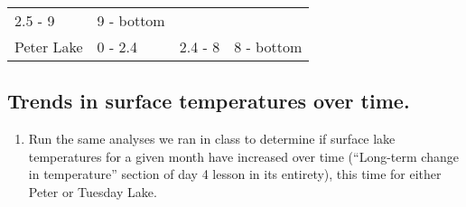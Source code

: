 \documentclass[]{article}
\providecommand{\tightlist}{%
  \setlength{\itemsep}{0pt}\setlength{\parskip}{0pt}}
\begin{document}
\begin{longtable}[]{@{}llll@{}}
\begin{minipage}[t]{0.21\columnwidth}
2.5 - 9\strut
\end{minipage} & \begin{minipage}[t]{0.21\columnwidth}\raggedright
9 - bottom\strut
\end{minipage}\tabularnewline
\begin{minipage}[t]{0.25\columnwidth}\raggedright
Peter Lake\strut
\end{minipage} & \begin{minipage}[t]{0.21\columnwidth}\raggedright
0 - 2.4\strut
\end{minipage} & \begin{minipage}[t]{0.21\columnwidth}\raggedright
2.4 - 8\strut
\end{minipage} & \begin{minipage}[t]{0.21\columnwidth}\raggedright
8 - bottom\strut
\end{minipage}\tabularnewline
\bottomrule
\end{longtable}

\hypertarget{trends-in-surface-temperatures-over-time.}{%
\subsection{Trends in surface temperatures over
time.}\label{trends-in-surface-temperatures-over-time.}}

\begin{enumerate}
\def\labelenumi{\arabic{enumi}.}
\setcounter{enumi}{10}
\tightlist
\item
  Run the same analyses we ran in class to determine if surface lake
  temperatures for a given month have increased over time (``Long-term
  change in temperature'' section of day 4 lesson in its entirety), this
  time for either Peter or Tuesday Lake.
\end{enumerate}
\end{document}
